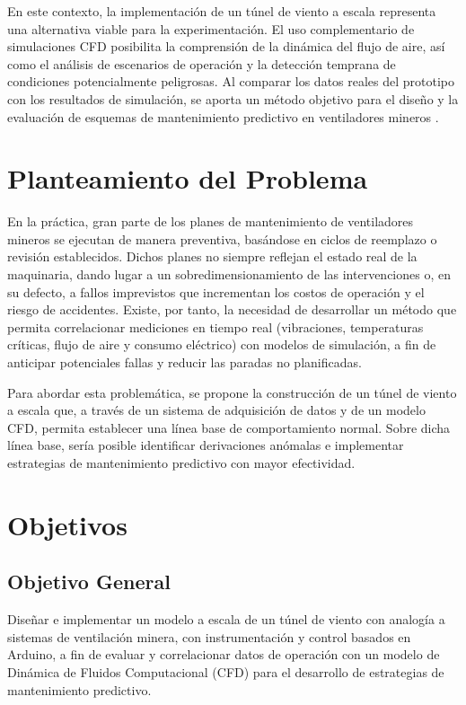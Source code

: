 En este contexto, la implementación de un túnel de viento a escala representa una alternativa viable para la experimentación. El uso complementario de simulaciones CFD posibilita la comprensión de la dinámica del flujo de aire, así como el análisis de escenarios de operación y la detección temprana de condiciones potencialmente peligrosas. Al comparar los datos reales del prototipo con los resultados de simulación, se aporta un método objetivo para el diseño y la evaluación de esquemas de mantenimiento predictivo en ventiladores mineros \cite{Sanchis2022}.

\section{Planteamiento del Problema}
En la práctica, gran parte de los planes de mantenimiento de ventiladores mineros se ejecutan de manera preventiva, basándose en ciclos de reemplazo o revisión establecidos. Dichos planes no siempre reflejan el estado real de la maquinaria, dando lugar a un sobredimensionamiento de las intervenciones o, en su defecto, a fallos imprevistos que incrementan los costos de operación y el riesgo de accidentes. Existe, por tanto, la necesidad de desarrollar un método que permita correlacionar mediciones en tiempo real (vibraciones, temperaturas críticas, flujo de aire y consumo eléctrico) con modelos de simulación, a fin de anticipar potenciales fallas y reducir las paradas no planificadas.

Para abordar esta problemática, se propone la construcción de un túnel de viento a escala que, a través de un sistema de adquisición de datos y de un modelo CFD, permita establecer una línea base de comportamiento normal. Sobre dicha línea base, sería posible identificar derivaciones anómalas e implementar estrategias de mantenimiento predictivo con mayor efectividad.

\section{Objetivos}
\subsection{Objetivo General}
Diseñar e implementar un modelo a escala de un túnel de viento con analogía a sistemas de ventilación minera, con instrumentación y control basados en Arduino, a fin de evaluar y correlacionar datos de operación con un modelo de Dinámica de Fluidos Computacional (CFD) para el desarrollo de estrategias de mantenimiento predictivo.

